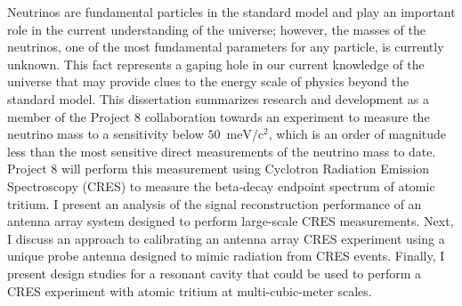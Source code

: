 
\vspace{-0.3in}

Neutrinos are fundamental particles in the standard model and play an important role in the current understanding of the universe; however, the masses of the neutrinos, one of the most fundamental parameters for any particle, is currently unknown. This fact represents a gaping hole in our current knowledge of the universe that may provide clues to the energy scale of physics beyond the standard model. This dissertation summarizes research and development as a member of the Project 8 collaboration towards an experiment to measure the neutrino mass to a sensitivity below $50$~$\mathrm{meV}/\mathrm{c}^2$, which is an order of magnitude less than the most sensitive direct measurements of the neutrino mass to date. Project 8 will perform this measurement using Cyclotron Radiation Emission Spectroscopy (CRES) to measure the beta-decay endpoint spectrum of atomic tritium. I present an analysis of the signal reconstruction performance of an antenna array system designed to perform large-scale CRES measurements. Next, I discuss an approach to calibrating an antenna array CRES experiment using a unique probe antenna designed to mimic radiation from CRES events. Finally, I present design studies for a resonant cavity that could be used to perform a CRES experiment with atomic tritium at multi-cubic-meter scales.